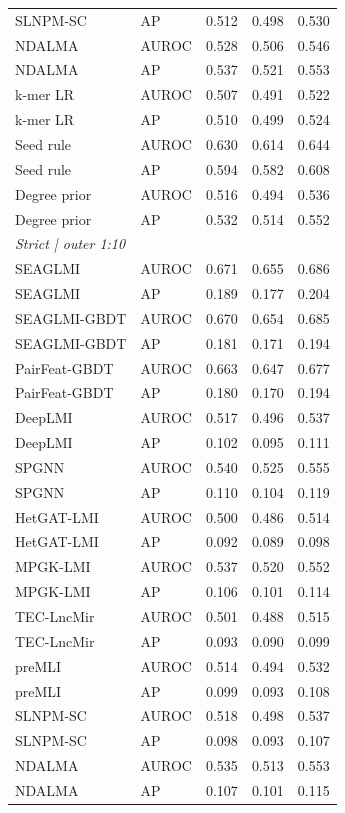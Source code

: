 {\begin{longtable}{lllll}
SLNPM-SC & AP & 0.512 & 0.498 & 0.530 \\
NDALMA & AUROC & 0.528 & 0.506 & 0.546 \\
NDALMA & AP & 0.537 & 0.521 & 0.553 \\
k-mer LR & AUROC & 0.507 & 0.491 & 0.522 \\
k-mer LR & AP & 0.510 & 0.499 & 0.524 \\
Seed rule & AUROC & 0.630 & 0.614 & 0.644 \\
Seed rule & AP & 0.594 & 0.582 & 0.608 \\
Degree prior & AUROC & 0.516 & 0.494 & 0.536 \\
Degree prior & AP & 0.532 & 0.514 & 0.552 \\
\multicolumn{5}{l}{\textit{Strict | outer 1:10}}\\
SEAGLMI & AUROC & 0.671 & 0.655 & 0.686 \\
SEAGLMI & AP & 0.189 & 0.177 & 0.204 \\
SEAGLMI-GBDT & AUROC & 0.670 & 0.654 & 0.685 \\
SEAGLMI-GBDT & AP & 0.181 & 0.171 & 0.194 \\
PairFeat-GBDT & AUROC & 0.663 & 0.647 & 0.677 \\
PairFeat-GBDT & AP & 0.180 & 0.170 & 0.194 \\
DeepLMI & AUROC & 0.517 & 0.496 & 0.537 \\
DeepLMI & AP & 0.102 & 0.095 & 0.111 \\
SPGNN & AUROC & 0.540 & 0.525 & 0.555 \\
SPGNN & AP & 0.110 & 0.104 & 0.119 \\
HetGAT-LMI & AUROC & 0.500 & 0.486 & 0.514 \\
HetGAT-LMI & AP & 0.092 & 0.089 & 0.098 \\
MPGK-LMI & AUROC & 0.537 & 0.520 & 0.552 \\
MPGK-LMI & AP & 0.106 & 0.101 & 0.114 \\
TEC-LncMir & AUROC & 0.501 & 0.488 & 0.515 \\
TEC-LncMir & AP & 0.093 & 0.090 & 0.099 \\
preMLI & AUROC & 0.514 & 0.494 & 0.532 \\
preMLI & AP & 0.099 & 0.093 & 0.108 \\
SLNPM-SC & AUROC & 0.518 & 0.498 & 0.537 \\
SLNPM-SC & AP & 0.098 & 0.093 & 0.107 \\
NDALMA & AUROC & 0.535 & 0.513 & 0.553 \\
NDALMA & AP & 0.107 & 0.101 & 0.115 \\

\end{longtable}}
